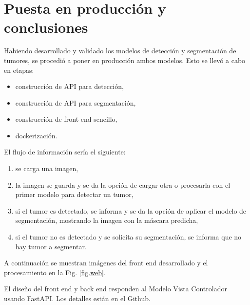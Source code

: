 
\chapter{Puesta en producción y conclusiones}

Habiendo desarrollado y validado los modelos de detección y segmentación de tumores, se procedió a poner en producción ambos modelos. Esto se llevó a cabo en etapas:

\begin{itemize}

\item construcción de API para detección,
\item construcción de API para segmentación,
\item construcción de front end sencillo,
\item dockerización.
\end{itemize}

El flujo de información sería el siguiente:

\begin{enumerate}
    \item se carga una imagen,
    \item la imagen se guarda y se da la opción de cargar otra o procesarla con el primer modelo para detectar un tumor,
    \item si el tumor es detectado, se informa y se da la opción de aplicar el modelo de segmentación, mostrando la imagen con la máscara predicha,
    \item si el tumor no es detectado y se solicita su segmentación, se informa que no hay tumor a segmentar.
\end{enumerate}

A continuación se muestran imágenes del front end desarrollado y el procesamiento en la Fig. \ref{fig.web}.

El diseño del front end y back end responden al Modelo Vista Controlador usando FastAPI. Los detalles están en el Github. 

